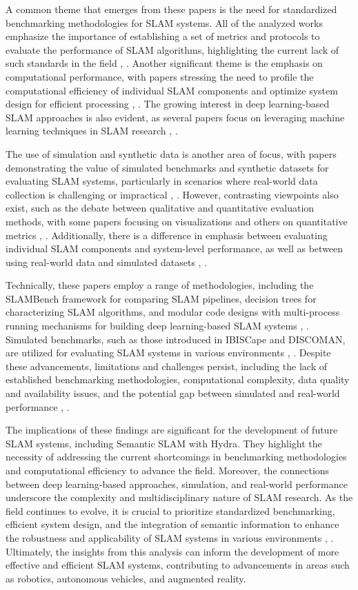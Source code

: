 \documentclass[conference]{IEEEtran}
\begin{document}
A common theme that emerges from these papers is the need for standardized benchmarking methodologies for SLAM systems. All of the analyzed works emphasize the importance of establishing a set of metrics and protocols to evaluate the performance of SLAM algorithms, highlighting the current lack of such standards in the field \cite{b1}, \cite{b3}. Another significant theme is the emphasis on computational performance, with papers stressing the need to profile the computational efficiency of individual SLAM components and optimize system design for efficient processing \cite{b2}, \cite{b5}. The growing interest in deep learning-based SLAM approaches is also evident, as several papers focus on leveraging machine learning techniques in SLAM research \cite{b1}, \cite{b4}.

The use of simulation and synthetic data is another area of focus, with papers demonstrating the value of simulated benchmarks and synthetic datasets for evaluating SLAM systems, particularly in scenarios where real-world data collection is challenging or impractical \cite{b3}, \cite{b5}. However, contrasting viewpoints also exist, such as the debate between qualitative and quantitative evaluation methods, with some papers focusing on visualizations and others on quantitative metrics \cite{b1}, \cite{b2}. Additionally, there is a difference in emphasis between evaluating individual SLAM components and system-level performance, as well as between using real-world data and simulated datasets \cite{b3}, \cite{b4}.

Technically, these papers employ a range of methodologies, including the SLAMBench framework for comparing SLAM pipelines, decision trees for characterizing SLAM algorithms, and modular code designs with multi-process running mechanisms for building deep learning-based SLAM systems \cite{b1}, \cite{b2}. Simulated benchmarks, such as those introduced in IBISCape and DISCOMAN, are utilized for evaluating SLAM systems in various environments \cite{b4}, \cite{b5}. Despite these advancements, limitations and challenges persist, including the lack of established benchmarking methodologies, computational complexity, data quality and availability issues, and the potential gap between simulated and real-world performance \cite{b3}, \cite{b5}.

The implications of these findings are significant for the development of future SLAM systems, including Semantic SLAM with Hydra. They highlight the necessity of addressing the current shortcomings in benchmarking methodologies and computational efficiency to advance the field. Moreover, the connections between deep learning-based approaches, simulation, and real-world performance underscore the complexity and multidisciplinary nature of SLAM research. As the field continues to evolve, it is crucial to prioritize standardized benchmarking, efficient system design, and the integration of semantic information to enhance the robustness and applicability of SLAM systems in various environments \cite{b1}, \cite{b4}. Ultimately, the insights from this analysis can inform the development of more effective and efficient SLAM systems, contributing to advancements in areas such as robotics, autonomous vehicles, and augmented reality.
\end{document}
